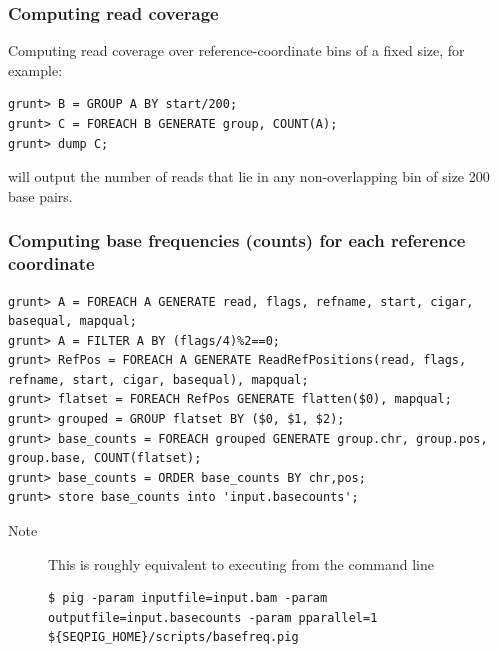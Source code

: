  \subsubsection{Computing read coverage}
Computing read coverage over reference-coordinate bins of a fixed size,
for example:
\begin{lstlisting}
grunt> B = GROUP A BY start/200;
grunt> C = FOREACH B GENERATE group, COUNT(A);
grunt> dump C; 
\end{lstlisting}
will output the number of reads that lie in any non-overlapping bin of size 200 base pairs.

 \subsubsection{Computing base frequencies (counts) for each reference coordinate}
\begin{lstlisting}
grunt> A = FOREACH A GENERATE read, flags, refname, start, cigar, basequal, mapqual;
grunt> A = FILTER A BY (flags/4)%2==0;
grunt> RefPos = FOREACH A GENERATE ReadRefPositions(read, flags, refname, start, cigar, basequal), mapqual;
grunt> flatset = FOREACH RefPos GENERATE flatten($0), mapqual;
grunt> grouped = GROUP flatset BY ($0, $1, $2);
grunt> base_counts = FOREACH grouped GENERATE group.chr, group.pos, group.base, COUNT(flatset);
grunt> base_counts = ORDER base_counts BY chr,pos;
grunt> store base_counts into 'input.basecounts';
\end{lstlisting}
\begin{description}
	\item[Note] This is roughly equivalent to executing from the command line
\begin{lstlisting}
$ pig -param inputfile=input.bam -param outputfile=input.basecounts -param pparallel=1 ${SEQPIG_HOME}/scripts/basefreq.pig 
\end{lstlisting}
\end{description}

